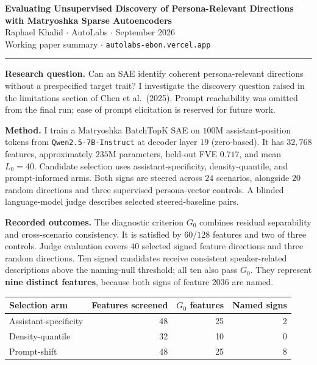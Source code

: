 \documentclass[11pt]{article}
\begin{document}
\begin{center}
{\Large\bfseries Evaluating Unsupervised Discovery of Persona-Relevant Directions\\[2pt]
with Matryoshka Sparse Autoencoders}\\[6pt]
{Raphael Khalid $\cdot$ AutoLabs $\cdot$ September 2026}\\[2pt]
{\small Working paper summary $\cdot$ \texttt{autolabs-ebon.vercel.app}}
\end{center}
\vspace{2pt}\hrule\vspace{6pt}

\textbf{Research question.}
Can an SAE identify coherent persona-relevant directions without a prespecified
target trait? I investigate the discovery question raised in the limitations
section of Chen et al.\ (2025). Prompt reachability was omitted from the final
run; ease of prompt elicitation is reserved for future work.

\textbf{Method.}
I train a Matryoshka BatchTopK SAE on $100$M assistant-position tokens from
\texttt{Qwen2.5-\allowbreak{}7B-\allowbreak{}Instruct} at decoder layer $19$ (zero-based). It has $32{,}768$
features, approximately $235$M parameters, held-out FVE $0.717$, and mean $L_0=40$.
Candidate selection uses assistant-specificity, density-quantile, and
prompt-informed arms. Both signs are steered across $24$ scenarios, alongside
$20$ random directions and three supervised persona-vector controls. A blinded
language-model judge describes selected steered-baseline pairs.

\textbf{Recorded outcomes.}
The diagnostic criterion $G_0$ combines residual separability and cross-scenario
consistency. It is satisfied by $60/128$ features and two of three controls. Judge
evaluation covers $40$ selected signed feature directions and three random
directions. Ten signed candidates receive consistent speaker-related descriptions
above the naming-null threshold; all ten also pass $G_0$. They represent
\textbf{nine distinct features}, because both signs of feature $2036$ are named.

\begin{center}\small
\begin{tabular}{lrrr}
\toprule
Selection arm & Features screened & $G_0$ features & Named signs \\
\midrule
Assistant-specificity & 48 & 25 & 2 \\
Density-quantile & 32 & 10 & 0 \\
Prompt-shift & 48 & 25 & 8 \\
\bottomrule
\end{tabular}
\end{center}
\end{document}
